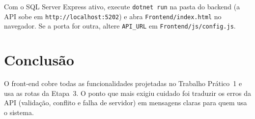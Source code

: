 \documentclass[12pt]{article}
\begin{document}
Com o SQL Server Express ativo, execute \texttt{dotnet run} na pasta do backend (a API sobe em
\texttt{http://localhost:5202}) e abra \texttt{Frontend/index.html} no navegador. Se a porta for outra,
altere \texttt{API\_URL} em \texttt{Frontend/js/config.js}.

\section{Conclusão}

O front-end cobre todas as funcionalidades projetadas no Trabalho Prático~1 e usa as rotas da Etapa~3.
O ponto que mais exigiu cuidado foi traduzir os erros da API (validação, conflito e falha de servidor)
em mensagens claras para quem usa o sistema.
\end{document}
